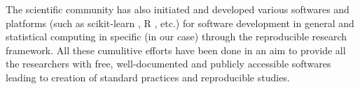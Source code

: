 The scientific community has also initiated and developed various softwares and platforms (such as scikit-learn 
\cite{pedregosa_scikit-learn_2018}, R \cite{chambers_software_2008},  etc.) for software development in general and 
statistical computing in specific (in our case) through the reproducible research framework. All these cumulitive 
efforts have been done in an aim to provide all the researchers with free, well-documented and publicly accessible 
softwares leading to creation of standard practices and reproducible studies.
